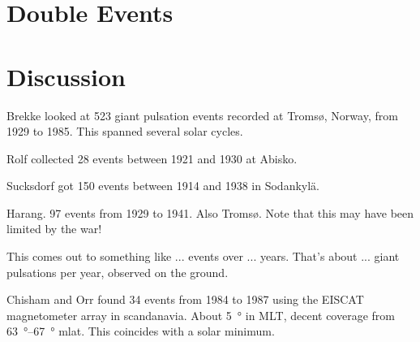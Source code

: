\section{Double Events}
  \label{sec_double}

\todo{$\cdots$}










\section{Discussion}

\todo{$\cdots$}






Brekke\cite{brekke_1987} looked at 523 giant pulsation events recorded at Troms{\o}, Norway, from 1929 to 1985. This spanned several solar cycles. 

Rolf\cite{rolf_1931} collected 28 events between 1921 and 1930 at Abisko. 

Sucksdorf\cite{sucksdorff_1939} got 150 events between 1914 and 1938 in Sodankyl{\"a}. 

Harang\cite{harang_1941}. 97 events from 1929 to 1941. Also Troms{\o}. Note that this may have been limited by the war! 

This comes out to something like ... events over ... years. That's about ... giant pulsations per year, observed on the ground. 


Chisham and Orr\cite{chisham_1991} found 34 events from 1984 to 1987 using the EISCAT magnetometer array in scandanavia. About \SI{5}{\degree} in MLT, decent coverage from \SIrange{63}{67}{\degree} mlat. This coincides with a solar minimum. 

